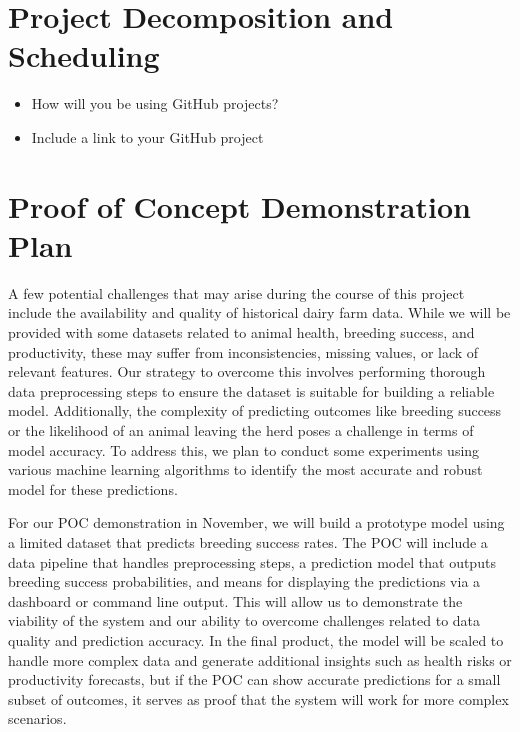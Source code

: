 \documentclass{article}
\begin{document}
\section{Project Decomposition and Scheduling}

\begin{itemize}
  \item How will you be using GitHub projects?
  \item Include a link to your GitHub project
\end{itemize}


\section{Proof of Concept Demonstration Plan}

A few potential challenges that may arise during the course of this project include the availability and quality of historical dairy farm data. While we will be provided with some datasets related to animal health, breeding success, and productivity, these may suffer from inconsistencies, missing values, or lack of relevant features. Our strategy to overcome this involves performing thorough data preprocessing steps to ensure the dataset is suitable for building a reliable model. Additionally, the complexity of predicting outcomes like breeding success or the likelihood of an animal leaving the herd poses a challenge in terms of model accuracy. To address this, we plan to conduct some experiments using various machine learning algorithms to identify the most accurate and robust model for these predictions.

For our POC demonstration in November, we will build a prototype model using a limited dataset that predicts breeding success rates. The POC will include a data pipeline that handles preprocessing steps, a prediction model that outputs breeding success probabilities, and means for displaying the predictions via a dashboard or command line output. This will allow us to demonstrate the viability of the system and our ability to overcome challenges related to data quality and prediction accuracy. In the final product, the model will be scaled to handle more complex data and generate additional insights such as health risks or productivity forecasts, but if the POC can show accurate predictions for a small subset of outcomes, it serves as proof that the system will work for more complex scenarios.
\end{document}
